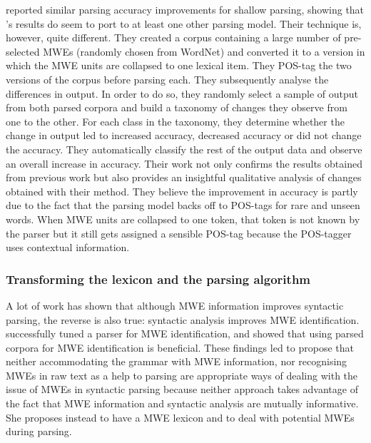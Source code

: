 \documentclass[output=paper]{LSP/langsci}
\begin{document}
                        \indent \citet{korkontzelosetal2010} reported similar parsing accuracy improvements for shallow parsing, showing that \citet{nivre2004multiword}'s results do seem to port to at least one other parsing model. Their technique is, however, quite different. They created a corpus containing a large number of pre-selected MWEs (randomly chosen from WordNet) and converted it to a version in which the MWE units are collapsed to one lexical item. They POS-tag the two versions of the corpus before parsing each. They subsequently analyse the differences in output. In order to do so, they randomly select a sample of output from both parsed corpora and build a taxonomy of changes they observe from one to the other. For each class in the taxonomy, they determine whether the change in output led to increased accuracy, decreased accuracy or did not change the accuracy. They automatically classify the rest of the output data and observe an overall increase in accuracy. Their work not only confirms the results obtained from previous work but also provides an insightful qualitative analysis of changes obtained with their method. They believe the improvement in accuracy is partly due to the fact that the parsing model backs off to POS-tags for rare and unseen words. When MWE units are collapsed to one token, that token is not known by the parser but it still gets assigned a sensible POS-tag because the POS-tagger uses contextual information. 
                        \subsubsection{Transforming the lexicon and the parsing algorithm}
                        \indent A lot of work has shown that although MWE information improves syntactic parsing, the reverse is also true: syntactic analysis improves MWE identification. \citet{greenetal13} successfully tuned a parser for MWE identification, \citet{weller&heid2010} and \citet{martens&vandeghinste2010} showed that using parsed corpora for MWE identification is beneficial. These findings led \citet{seretan2013} to propose that neither accommodating the grammar with MWE information, nor recognising MWEs in raw text as a help to parsing are appropriate ways of dealing with the issue of MWEs in syntactic parsing because neither approach takes advantage of the fact that MWE information and syntactic analysis are mutually informative. She proposes instead to have a MWE lexicon and to deal with potential MWEs during parsing.
\end{document}
